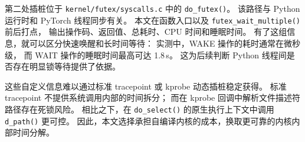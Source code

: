 第二处插桩位于 \texttt{kernel/futex/syscalls.c} 中的 \texttt{do\_futex()}。
该路径与 Python 运行时和 PyTorch 线程同步有关\cite{pytorch}。
本文在函数入口以及 \texttt{futex\_wait\_multiple()} 前后打点，
输出操作码、返回值、总耗时、CPU 时间和睡眠时间。
有了这组信息，就可以区分快速唤醒和长时间等待：
实测中，WAKE 操作的耗时通常在微秒级，
而 WAIT 操作的睡眠时间最高可达 1.8\,s。
这为后续判断 Python 线程间是否存在明显锁等待提供了依据。

这些自定义信息难以通过标准 tracepoint 或 kprobe 动态插桩稳定获得。
标准 tracepoint 不提供系统调用内部的时间拆分；
而在 kprobe 回调中解析文件描述符路径存在死锁风险。
相比之下，在 \texttt{do\_select()} 的原生执行上下文中调用 \texttt{d\_path()} 更可控。
因此，本文选择承担自编译内核的成本，换取更可靠的内核内部时间分解。


